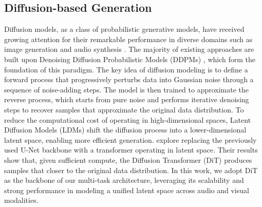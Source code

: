 \subsection{Diffusion-based Generation}\label{subsec:diffusion}
Diffusion models, as a class of probabilistic generative models, have received growing attention for their remarkable performance in diverse domains such as image generation \cite{ramesh2022hierarchical} and audio synthesis \cite{liu2024audioldm2}. The majority of existing approaches are built upon Denoising Diffusion Probabilistic Models (DDPMs) \cite{ho2020denoising}, which form the foundation of this paradigm. The key idea of diffusion modeling is to define a forward process that progressively perturbs data into Gaussian noise through a sequence of noise-adding steps. The model is then trained to approximate the reverse process, which starts from pure noise and performs iterative denoising steps to recover samples that approximate the original data distribution. To reduce the computational cost of operating in high-dimensional spaces, Latent Diffusion Models (LDMs) \cite{rombach2022high} shift the diffusion process into a lower-dimensional latent space, enabling more efficient generation. \cite{peebles2023scalable} explore replacing the previously used U-Net backbone with a transformer operating in latent space. Their results show that, given sufficient compute, the Diffusion Transformer (DiT) produces samples that closer to the original data distribution. In this work, we adopt DiT as the backbone of our multi-task architecture, leveraging its scalability and strong performance in modeling a unified latent space across audio and visual modalities.